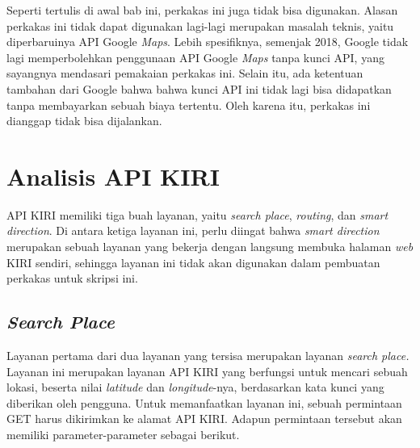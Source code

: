 Seperti tertulis di awal bab ini, perkakas ini juga tidak bisa digunakan. Alasan perkakas ini tidak dapat digunakan lagi-lagi merupakan masalah teknis, yaitu diperbaruinya API Google \textit{Maps}. Lebih spesifiknya, semenjak 2018, Google tidak lagi memperbolehkan penggunaan API Google \textit{Maps} tanpa kunci API, yang sayangnya mendasari pemakaian perkakas ini. Selain itu, ada ketentuan tambahan dari Google bahwa bahwa kunci API ini tidak lagi bisa didapatkan tanpa membayarkan sebuah biaya tertentu. Oleh karena itu, perkakas ini dianggap tidak bisa dijalankan.

\section{Analisis API KIRI}
\label{sec:analysis-kiri}

API KIRI memiliki tiga buah layanan, yaitu \textit{search place}, \textit{routing}, dan \textit{smart direction}. Di antara ketiga layanan ini, perlu diingat bahwa \textit{smart direction} merupakan sebuah layanan yang bekerja dengan langsung membuka halaman \textit{web} KIRI sendiri, sehingga layanan ini tidak akan digunakan dalam pembuatan perkakas \cl untuk skripsi ini.

\subsection{\textit{Search Place}}
\label{sec:analysis-kiri-searchplace}

Layanan pertama dari dua layanan yang tersisa merupakan layanan \textit{search place.} Layanan ini merupakan layanan API KIRI yang berfungsi untuk mencari sebuah lokasi, beserta nilai \textit{latitude} dan \textit{longitude}-nya, berdasarkan kata kunci yang diberikan oleh pengguna. Untuk memanfaatkan layanan ini, sebuah permintaan GET harus dikirimkan ke alamat API KIRI. Adapun permintaan tersebut akan memiliki parameter-parameter sebagai berikut.

